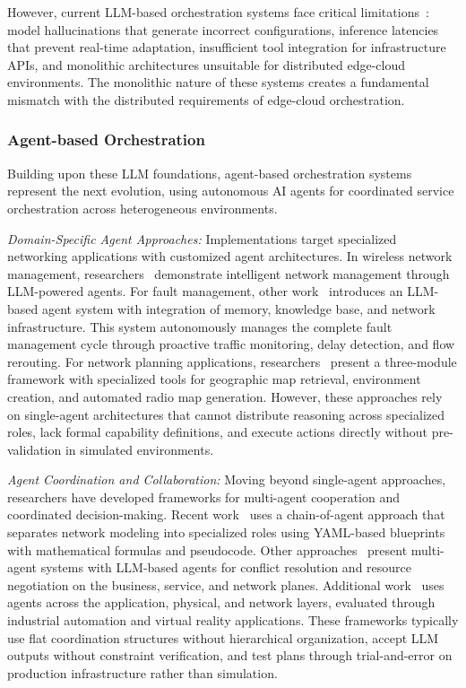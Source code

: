 However, current \ac{LLM}-based orchestration systems face critical limitations~\cite{NEURIPS2024_6aebba00, struggle_with_real_time_adaptation2025}: model hallucinations that generate incorrect configurations, inference latencies that prevent real-time adaptation, insufficient tool integration for infrastructure \acp{API}, and monolithic architectures unsuitable for distributed edge-cloud environments. The monolithic nature of these systems creates a fundamental mismatch with the distributed requirements of edge-cloud orchestration.

\subsubsection{Agent-based Orchestration}

Building upon these \ac{LLM} foundations, agent-based orchestration systems represent the next evolution, using autonomous \ac{AI} agents for coordinated service orchestration across heterogeneous environments.

\textit{Domain-Specific Agent Approaches:} Implementations target specialized networking applications with customized agent architectures. In wireless network management, researchers~\cite{WirelessAgentLLM2025} demonstrate intelligent network management through \ac{LLM}-powered agents. For fault management, other work~\cite{LLMAgentsProactiveFaultTolerant2024} introduces an \ac{LLM}-based agent system with integration of memory, knowledge base, and network infrastructure. This system autonomously manages the complete fault management cycle through proactive traffic monitoring, delay detection, and flow rerouting. For network planning applications, researchers~\cite{RadioMapAgentsNetworkPlanning2025} present a three-module framework with specialized tools for geographic map retrieval, environment creation, and automated radio map generation. However, these approaches rely on single-agent architectures that cannot distribute reasoning across specialized roles, lack formal capability definitions, and execute actions directly without pre-validation in simulated environments.

\textit{Agent Coordination and Collaboration:} Moving beyond single-agent approaches, researchers have developed frameworks for multi-agent cooperation and coordinated decision-making. Recent work~\cite{HermesLLMFramework2024} uses a chain-of-agent approach that separates network modeling into specialized roles using \ac{YAML}-based blueprints with mathematical formulas and pseudocode. Other approaches~\cite{MaestroLLMCollaborative2024} present multi-agent systems with \ac{LLM}-based agents for conflict resolution and resource negotiation on the business, service, and network planes. Additional work~\cite{xiao2025agentnet} uses agents across the application, physical, and network layers, evaluated through industrial automation and virtual reality applications. These frameworks typically use flat coordination structures without hierarchical organization, accept \ac{LLM} outputs without constraint verification, and test plans through trial-and-error on production infrastructure rather than simulation.

